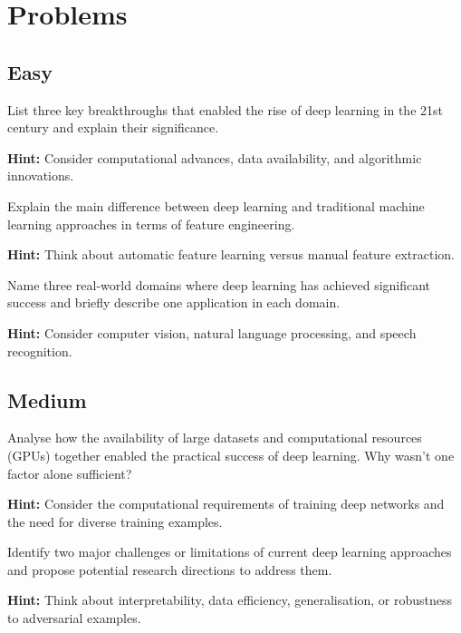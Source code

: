 
\section*{Problems}

\subsection*{Easy}

\begin{problem}
List three key breakthroughs that enabled the rise of deep learning in the 21st century and explain their significance.

\textbf{Hint:} Consider computational advances, data availability, and algorithmic innovations.
\end{problem}

\begin{problem}
Explain the main difference between deep learning and traditional machine learning approaches in terms of feature engineering.

\textbf{Hint:} Think about automatic feature learning versus manual feature extraction.
\end{problem}

\begin{problem}
Name three real-world domains where deep learning has achieved significant success and briefly describe one application in each domain.

\textbf{Hint:} Consider computer vision, natural language processing, and speech recognition.
\end{problem}

\subsection*{Medium}

\begin{problem}
Analyse how the availability of large datasets and computational resources (GPUs) together enabled the practical success of deep learning. Why wasn't one factor alone sufficient?

\textbf{Hint:} Consider the computational requirements of training deep networks and the need for diverse training examples.
\end{problem}

\begin{problem}
Identify two major challenges or limitations of current deep learning approaches and propose potential research directions to address them.

\textbf{Hint:} Think about interpretability, data efficiency, generalisation, or robustness to adversarial examples.
\end{problem}

